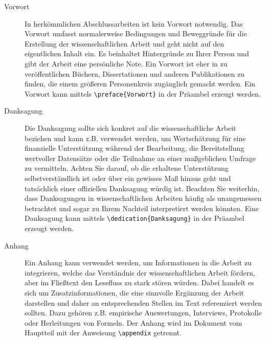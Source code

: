 \documentclass[
%
	thesis=paper,		%
	compactlistof,		%
	noauthorship,		%
%
	fancy,				%
%
%
]{hsmw-thesis}
\begin{document}
\begin{description}
		\item[Vorwort]\label{itm:preface}
		In herkömmlichen Abschlussarbeiten ist kein Vorwort notwendig.
		Das Vorwort umfasst normalerweise Bedingungen und Beweggründe für die Erstellung der wissenschaftlichen Arbeit und geht nicht auf den eigentlichen Inhalt ein.
		Es beinhaltet Hintergründe zu Ihrer Person und gibt der Arbeit eine persönliche Note.
		Ein Vorwort ist eher in zu veröffentlichen Büchern, Dissertationen und anderen Publikationen zu finden, die einem größeren Personenkreis zugänglich gemacht werden.
		Ein Vorwort kann mittels \verb|\preface{Vorwort}| in der Präambel erzeugt werden.
		
		\item[Danksagung]\label{itm:dedication}
		Die Danksagung sollte sich konkret auf die wissenschaftliche Arbeit beziehen und kann z.B. verwendet werden, um Wertschätzung für eine finanzielle Unterstützung während der Bearbeitung, die Bereitstellung wertvoller Datensätze oder die Teilnahme an einer maßgeblichen Umfrage zu vermitteln.
		Achten Sie darauf, ob die erhaltene Unterstützung selbstverständlich ist oder über ein gewisses Maß hinaus geht und tatsächlich einer offiziellen Danksagung würdig ist.
		Beachten Sie weiterhin, dass Danksagungen in wissenschaftlichen Arbeiten häufig als unangemessen betrachtet und sogar zu Ihrem Nachteil interpretiert werden könnten.
		Eine Danksagung kann mittels \verb|\dedication{Danksagung}| in der Präambel erzeugt werden.
		
		\item[Anhang]\label{itm:appendix}
		Ein Anhang kann verwendet werden, um Informationen in die Arbeit zu integrieren, welche das Verständnis der wissenschaftlichen Arbeit fördern, aber im Fließtext den Lesefluss zu stark stören würden.
		Dabei handelt es sich um Zusatzinformationen, die eine sinnvolle Ergänzung der Arbeit darstellen und daher an entsprechenden Stellen im Text referenziert werden sollten.
		Dazu gehören z.B. empirische Auswertungen, Interviews, Protokolle oder Herleitungen von Formeln.
		Der Anhang wird im Dokument vom Hauptteil mit der Anweisung \verb|\appendix| getrennt.
		

\end{description}
\end{document}
